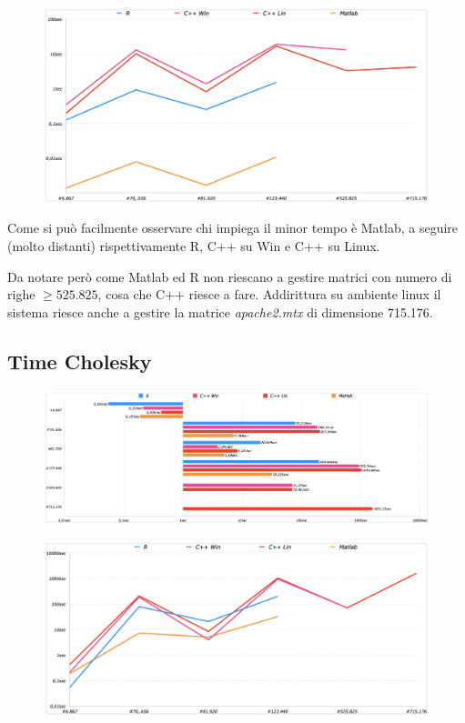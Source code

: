 \documentclass[preprint,12pt]{elsarticle}
\begin{document}
\begin{figure}[H]
	\centering
	\includegraphics[width=\linewidth]{setup2}
\end{figure}

Come si può facilmente osservare chi impiega il minor tempo è Matlab, a seguire (molto distanti) rispettivamente R, C++ su Win e C++ su Linux.


Da notare però come Matlab ed R non riescano a gestire matrici con numero di righe $\geq 525.825$, cosa che C++ riesce a fare. Addirittura su ambiente linux il sistema riesce anche a gestire la matrice \textit{apache2.mtx} di dimensione 715.176.

\subsection{Time Cholesky}

\begin{figure}[H]
	\centering
	\includegraphics[width=\linewidth]{cholesky1}
\end{figure}

\begin{figure}[H]
	\centering
	\includegraphics[width=\linewidth]{cholesky2}
\end{figure}
\end{document}
